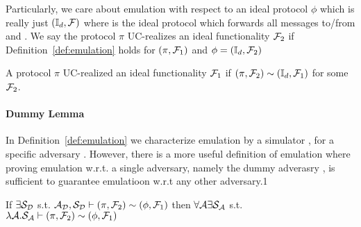 Particularly, we care about emulation with respect to an ideal protocol $\phi$ which is really just $(\mathbb{I}_d, \mathcal{F})$ where \idealP is the ideal protocol which forwards all messages to/from \Environment and \F.
We say the protocol $\pi$ UC-realizes an ideal functionality $\mathcal{F}_2$ if Definition~\ref{def:emulation} holds for $(\pi, \mathcal{F}_1)$ and  $\phi = (\mathbb{I}_d, \mathcal{F}_2)$

\begin{definition}[UC-Realize]
A protocol $\pi$ UC-realized an ideal functionality $\mathcal{F}_1$ if $(\pi, \mathcal{F}_2) \sim (\mathbb{I}_d, \mathcal{F}_1)$ for some $\mathcal{F}_2$.
\end{definition}

\paragraph{Dummy Lemma}

In Definition~\ref{def:emulation} we characterize emulation by a simulator \Simulator, for a specific adversary \Adversary.
However, there is a more useful definition of emulation where proving emulation w.r.t. a single adversary, namely the dummy adverasry \DummyAdv, is sufficient to guarantee emulatioon w.r.t any other adversary.1

\begin{theorem}\label{thm:dummy}
If $\exists \mathcal{S}_{\mathcal{D}}$ s.t. $ \mathcal{A}_\mathcal{D}, \mathcal{S}_{\mathcal{D}} \vdash (\pi, \mathcal{F}_2) \sim (\phi, \mathcal{F}_1)$ then $\forall \mathcal{A} \exists \mathcal{S}_\mathcal{A}$ s.t. $\lambda \mathcal{A} . \mathcal{S}_\mathcal{A}\vdash  (\pi, \mathcal{F}_2) \sim (\phi, \mathcal{F}_1)$ 

\end{theorem}

